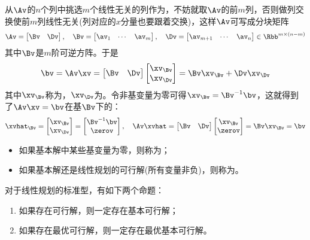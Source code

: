 \documentclass{ctexart}
\begin{document}
从$\Av$的$n$个列中挑选$m$个线性无关的列作为，不妨就取$\Av$的前$m$列，否则做列交换使前$m$列线性无关(列对应的$x$分量也要跟着交换)，这样$\Av$可写成分块矩阵
\begin{align*}
    \Av = \begin{bmatrix} \Bv & \Dv \end{bmatrix}, \quad \Bv =
    \begin{bmatrix}
        \av_1 & \cdots & \av_m
    \end{bmatrix}, \quad \Dv =
    \begin{bmatrix}
        \av_{m+1} & \cdots & \av_n
    \end{bmatrix} \in \Rbb^{m \times (n-m)}
\end{align*}
其中$\Bv$是$m$阶可逆方阵。于是
\begin{align*}
    \bv = \Av \xv = \begin{bmatrix} \Bv & \Dv \end{bmatrix} 
    \begin{bmatrix} \xv_\Bv \\ \xv_\Dv \end{bmatrix} = \Bv \xv_\Bv + \Dv \xv_\Dv
\end{align*}
其中$\xv_\Bv$称为，$\xv_\Dv$为。令非基变量为零可得$\xv_\Bv = \Bv^{-1} \bv$，这就得到了$\Av \xv = \bv$在基$\Bv$下的：
\begin{align*}
    \xvhat_\Bv = \begin{bmatrix} \xv_\Bv \\ \xv_\Dv \end{bmatrix} = \begin{bmatrix} \Bv^{-1} \bv \\ \zerov \end{bmatrix}, \quad \Av \xvhat = \begin{bmatrix} \Bv & \Dv \end{bmatrix} \begin{bmatrix} \xv_\Bv \\ \zerov \end{bmatrix} = \Bv \xv_\Bv = \bv
\end{align*}
\begin{itemize}
    \item 如果基本解中某些基变量为零，则称为；
    \item 如果基本解还是线性规划的可行解(所有变量非负)，则称为。
\end{itemize}

\begin{theorem} [线性规划基本定理]
    对于线性规划的标准型，有如下两个命题：
    \begin{enumerate}
        \item 如果存在可行解，则一定存在基本可行解；
        \item 如果存在最优可行解，则一定存在最优基本可行解。
    \end{enumerate}
\end{theorem}
\end{document}
